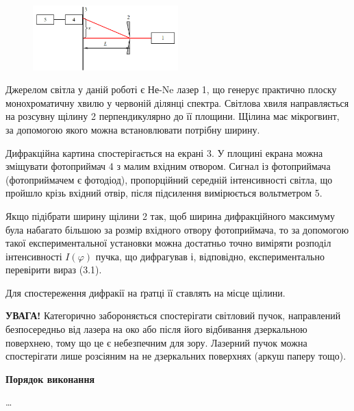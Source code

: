 \documentclass[12pt,a4paper]{article}
\begin{document}
    \begin{figure}[!ht]

        \renewcommand{\thefigure}{3.\arabic{figure}} %

        \centering
        \includegraphics[width=0.5\textwidth]{3.4.png}
        \caption{}
        \label{fig4:schema}

    \end{figure}

    Джерелом світла у
    даній роботі є Не-Ne лазер 1, що генерує практично плоску монохроматичну
    хвилю у червоній ділянці спектра. Світлова хвиля направляється на розсувну
    щілину 2 перпендикулярно до її площини. Щілина має мікрогвинт, за допомогою
    якого можна встановлювати потрібну ширину.

    Дифракційна картина спостерігається на екрані 3. У площині екрана можна
    зміщувати фотоприймач 4 з малим вхідним отвором. Сигнал із фотоприймача
    (фотоприймачем є фотодіод), пропорційний середній інтенсивності світла, що
    пройшло крізь вхідний отвір, після підсилення вимірюється вольтметром 5.

    Якщо підібрати ширину щілини 2 так, щоб ширина дифракційного
    максимуму була набагато більшою за розмір вхідного отвору фотоприймача, то за
    допомогою такої експериментальної установки можна достатньо точно виміряти
    розподіл інтенсивності $I(\varphi)$ пучка, що дифрагував і, відповідно, експериментально
    перевірити вираз (3.1).

    Для спостереження дифракії на ґратці її ставлять на місце щілини.

    \textbf{УВАГА!} Категорично забороняється спостерігати світловий пучок, направлений
    безпосередньо від лазера на око або після його відбивання дзеркальною
    поверхнею, тому що це є небезпечним для зору. Лазерний пучок можна
    спостерігати лише розсіяним на не дзеркальних поверхнях (аркуш паперу тощо).

    \begin{center} \textbf{Порядок виконання} \end{center}
    
    \dots
\end{document}
